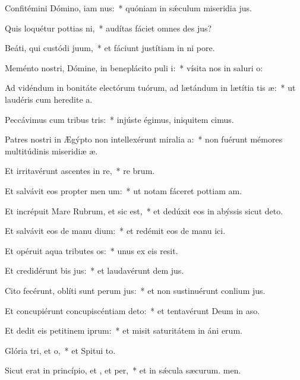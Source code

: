 \item Confitémini Dómino, iam nus:~* quóniam in sǽculum miseridia jus.
\item Quis loquétur pottias ni,~* audítas fáciet omnes des jus?
\item Beáti, qui custódi juum,~* et fáciunt justítiam in ni pore.
\item Meménto nostri, Dómine, in beneplácito puli i:~* vísita nos in saluri o:
\item Ad vidéndum in bonitáte electórum tuórum, ad lætándum in lætítia tis æ:~* ut laudéris cum heredite a.
\item Peccávimus cum tribus tris:~* injúste égimus, iniquitem cimus.
\item Patres nostri in Ægýpto non intellexérunt miralia a:~* non fuérunt mémores multitúdinis miseridiæ æ.
\item Et irritavérunt ascentes in re,~* re brum.
\item Et salvávit eos propter men um:~* ut notam fáceret pottiam am.
\item Et incrépuit Mare Rubrum, et sic est,~* et dedúxit eos in abýssis sicut  deto.
\item Et salvávit eos de manu dium:~* et redémit eos de manu ici.
\item Et opéruit aqua tributes os:~* unus ex eis  resit.
\item Et credidérunt bis jus:~* et laudavérunt dem jus.
\item Cito fecérunt, oblíti sunt perum jus:~* et non sustinuérunt conlium jus.
\item Et concupiérunt concupiscéntiam  deto:~* et tentavérunt Deum in aso.
\item Et dedit eis petitinem iprum:~* et misit saturitátem in áni erum.
\item Glória tri, et o,~* et Spitui to.
\item Sicut erat in princípio, et , et per,~* et in sǽcula sæcurum. men.
